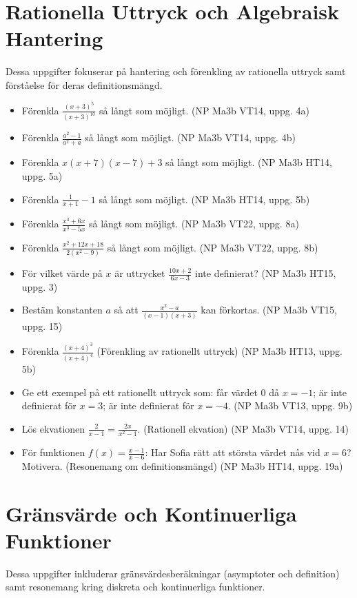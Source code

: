 \documentclass{article}
\begin{document}
\section{Rationella Uttryck och Algebraisk Hantering}

Dessa uppgifter fokuserar på hantering och förenkling av rationella uttryck samt förståelse för deras definitionsmängd.

\begin{itemize}
    \item Förenkla $\frac{(x+3)^5}{(x+3)^{10}}$ så långt som möjligt. (NP Ma3b VT14, uppg. 4a)
    \item Förenkla $\frac{a^2-1}{a^2+a}$ så långt som möjligt. (NP Ma3b VT14, uppg. 4b)
    \item Förenkla $x(x+7)(x-7)+3$ så långt som möjligt. (NP Ma3b HT14, uppg. 5a)
    \item Förenkla $\frac{1}{x+1} - 1$ så långt som möjligt. (NP Ma3b HT14, uppg. 5b)
    \item Förenkla $\frac{x^3+6x}{x^3-5x}$ så långt som möjligt. (NP Ma3b VT22, uppg. 8a)
    \item Förenkla $\frac{x^2+12x+18}{2(x^2-9)}$ så långt som möjligt. (NP Ma3b VT22, uppg. 8b)
    \item För vilket värde på $x$ är uttrycket $\frac{10x+2}{6x-3}$ inte definierat? (NP Ma3b HT15, uppg. 3)
    \item Bestäm konstanten $a$ så att $\frac{x^2-a}{(x-1)(x+3)}$ kan förkortas. (NP Ma3b VT15, uppg. 15)
    \item Förenkla $\frac{(x+4)^3}{(x+4)^4}$ (Förenkling av rationellt uttryck) (NP Ma3b HT13, uppg. 5b)
    \item Ge ett exempel på ett rationellt uttryck som: får värdet 0 då $x=-1$; är inte definierat för $x=3$; är inte definierat för $x=-4$. (NP Ma3b VT13, uppg. 9b)
    \item Lös ekvationen $\frac{2}{x-1} = \frac{2x}{x^2-1}$. (Rationell ekvation) (NP Ma3b VT14, uppg. 14)
    \item För funktionen $f(x) = \frac{x-1}{x-6}$: Har Sofia rätt att största värdet nås vid $x=6$? Motivera. (Resonemang om definitionsmängd) (NP Ma3b HT14, uppg. 19a)
\end{itemize}

\section{Gränsvärde och Kontinuerliga Funktioner}

Dessa uppgifter inkluderar gränsvärdesberäkningar (asymptoter och definition) samt resonemang kring diskreta och kontinuerliga funktioner.
\end{document}

